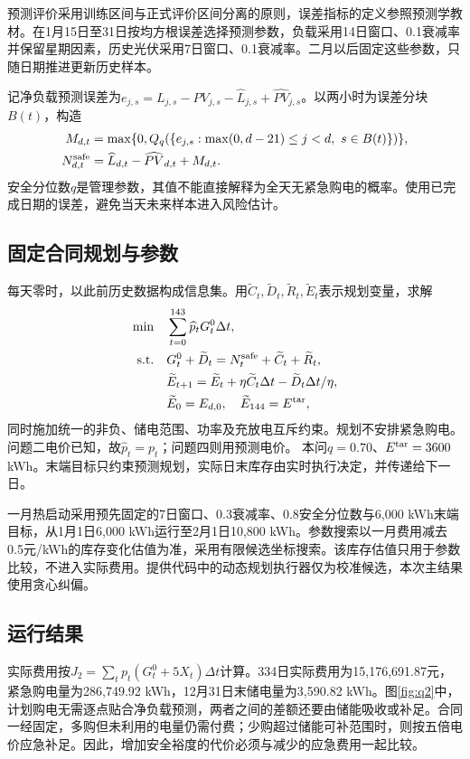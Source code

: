 \documentclass[12pt,a4paper]{ctexart}
\begin{document}
预测评价采用训练区间与正式评价区间分离的原则，误差指标的定义参照预测学教材\cite{forecast}。在1月15日至31日按均方根误差选择预测参数，负载采用14日窗口、0.1衰减率并保留星期因素，历史光伏采用7日窗口、0.1衰减率。二月以后固定这些参数，只随日期推进更新历史样本。

记净负载预测误差为$e_{j,s}=L_{j,s}-PV_{j,s}-\widehat L_{j,s}+\widehat{PV}_{j,s}$。以两小时为误差分块$B(t)$，构造
\begin{align}
M_{d,t}&=\max\{0,Q_q(\{e_{j,s}:\max(0,d-21)\le j<d,\ s\in B(t)\})\},\\
N^{\rm safe}_{d,t}&=\widehat L_{d,t}-\widehat{PV}_{d,t}+M_{d,t}.
\end{align}
安全分位数$q$是管理参数，其值不能直接解释为全天无紧急购电的概率。使用已完成日期的误差，避免当天未来样本进入风险估计。

\subsection{固定合同规划与参数}
每天零时，以此前历史数据构成信息集。用$\widetilde C_t,\widetilde D_t,\widetilde R_t,\widetilde E_t$表示规划变量，求解
\begin{align}
\min\quad &\sum_{t=0}^{143}\widehat p_tG_t^0\Delta t,\\
\text{s.t.}\quad&G_t^0+\widetilde D_t=N_t^{\rm safe}+\widetilde C_t+\widetilde R_t,\\
&\widetilde E_{t+1}=\widetilde E_t+\eta\widetilde C_t\Delta t-\widetilde D_t\Delta t/\eta,\\
&\widetilde E_0=E_{d,0},\quad \widetilde E_{144}=E^{\rm tar},
\end{align}
同时施加统一的非负、储电范围、功率及充放电互斥约束。规划不安排紧急购电。问题二电价已知，故$\widehat p_t=p_t$；问题四则用预测电价。
本问$q=0.70$、$E^{\rm tar}=3600$ kWh。末端目标只约束预测规划，实际日末库存由实时执行决定，并传递给下一日。

一月热启动采用预先固定的7日窗口、0.3衰减率、0.8安全分位数与6,000 kWh末端目标，从1月1日6,000 kWh运行至2月1日10,800 kWh。参数搜索以一月费用减去0.5元/kWh的库存变化估值为准，采用有限候选坐标搜索。该库存估值只用于参数比较，不进入实际费用。提供代码中的动态规划执行器仅为校准候选，本次主结果使用贪心纠偏。

\subsection{运行结果}
实际费用按$J_2=\sum_t p_t(G_t^0+5X_t)\Delta t$计算。334日实际费用为15,176,691.87元，紧急购电量为286,749.92 kWh，12月31日末储电量为3,590.82 kWh。图\ref{fig:q2}中，计划购电无需逐点贴合净负载预测，两者之间的差额还要由储能吸收或补足。合同一经固定，多购但未利用的电量仍需付费；少购超过储能可补范围时，则按五倍电价应急补足。因此，增加安全裕度的代价必须与减少的应急费用一起比较。
\end{document}
